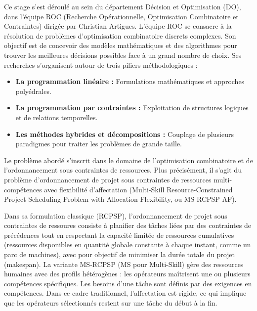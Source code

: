 Ce stage s'est déroulé au sein du département Décision et Optimisation (DO), dans l'équipe ROC (Recherche Opérationnelle, Optimisation Combinatoire et Contraintes) dirigée par Christian Artigues. L'équipe ROC se consacre à la résolution de problèmes d'optimisation combinatoire discrets complexes. Son objectif est de concevoir des modèles mathématiques et des algorithmes pour trouver les meilleures décisions possibles face à un grand nombre de choix. Ses recherches s'organisent autour de trois piliers méthodologiques :

\begin{itemize}
    \item \textbf{La programmation linéaire :} Formulations mathématiques et approches polyédrales.

    \item \textbf{La programmation par contraintes :} Exploitation de structures logiques et de relations temporelles.

    \item \textbf{Les méthodes hybrides et décompositions :} Couplage de plusieurs paradigmes pour traiter les problèmes de grande taille.
\end{itemize}

\bigskip


Le problème abordé s'inscrit dans le domaine de l'optimisation combinatoire et de l'ordonnance\-ment sous contraintes de ressources. Plus précisément, il s'agit du problème d'ordonnancement de projet sous contraintes de ressources multi-compétences avec flexibilité d'affectation (Multi-Skill Resource-Constrained Project Scheduling Problem with Allocation Flexibility, ou MS-RCPSP-AF).

\bigskip
Dans sa formulation classique (RCPSP), l'ordonnancement de projet sous contraintes de ressour\-es consiste à planifier des tâches liées par des contraintes de précédences tout en respectant la capacité limitée de ressources cumulatives (ressources disponibles en quantité globale constante à chaque instant, comme un parc de machines), avec pour objectif de minimiser la durée totale du projet (makespan). La variante MS-RCPSP (MS pour Multi-Skill) gère des ressources humaines avec des profils hétérogènes : les opérateurs maîtrisent une ou plusieurs compétences spécifiques. Les besoins d'une tâche sont définis par des exigences en compétences. Dans ce cadre traditionnel, l'affectation est rigide, ce qui implique que les opérateurs sélectionnés restent sur une tâche du début à la fin.

